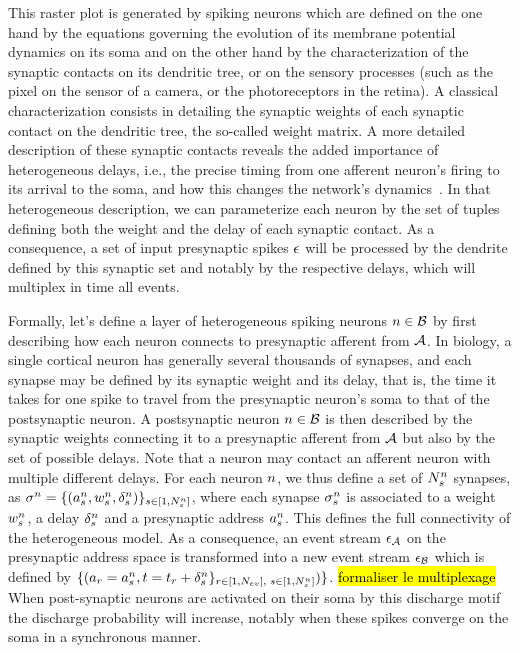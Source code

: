 \documentclass[default]{sn-jnl}%
\theoremstyle{thmstyleone}%
\theoremstyle{thmstyletwo}%
\theoremstyle{thmstylethree}%
\newcommand{\note}[1]{{\sethlcolor{yellow}\hl{#1}}}
\begin{document}
This raster plot is generated by spiking neurons which are defined on the one hand by the equations governing the evolution of its membrane potential dynamics on its soma and on the other hand by the characterization of the synaptic contacts on its dendritic tree, or on the sensory processes (such as the pixel on the sensor of a camera, or the photoreceptors in the retina). A classical characterization consists in detailing the synaptic weights of each synaptic contact on the dendritic tree, the so-called weight matrix. A more detailed description of these synaptic contacts reveals the added importance of heterogeneous delays, i.e., the precise timing from one afferent neuron's firing to its arrival to the soma, and how this changes the network's dynamics~\citep{izhikevich_polychronization_2006}. In that heterogeneous description, we can parameterize each neuron by the set of tuples defining both the weight and the delay of each synaptic contact. As a consequence, a set of input presynaptic spikes $\epsilon$ will be processed by the dendrite defined by this synaptic set and notably by the respective delays, which will multiplex in time all events. 

Formally, let's define a layer of heterogeneous spiking neurons $n \in \mathcal{B}$ by first describing how each neuron connects to presynaptic afferent from $\mathcal{A}$. In biology, a single cortical neuron has generally several thousands of synapses, and each synapse may be defined by its synaptic weight and its delay, that is, the time it takes for one spike to travel from the presynaptic neuron's soma to that of the postsynaptic neuron. A postsynaptic neuron $n \in \mathcal{B}$ is then described by the synaptic weights connecting it to a presynaptic afferent from $\mathcal{A}$ but also by the set of possible delays. Note that a neuron may contact an afferent neuron with multiple different delays. For each neuron $n$, we thus define a set of $N_{s}^n$ synapses, as  $\sigma^n = \{(a^n_s, w^n_s, \delta^n_s)\}_{s \in [1,N_{s}^n]}$, where each synapse $\sigma^n_s$ is associated to a weight $w^n_s$, a delay $\delta^n_s$ and a presynaptic address $a^n_s$. This defines the full connectivity of the heterogeneous model. As a consequence, an event stream $\epsilon_{\mathcal{A}}$ on the presynaptic address space is transformed into a new event stream $\epsilon_{\mathcal{B}}$ which is defined by 
$\{ (a_r = 
 a_s^n, t=t_r + 
\delta_s^n \}_{ r \in [1,N_{ev}]\text{, }s \in [1,N_{s}^n]} )
\}$. \note{formaliser le multiplexage}
When post-synaptic neurons are activated on their soma by this discharge motif the discharge probability will increase, notably when these spikes converge on the soma in a synchronous manner. 
\end{document}
